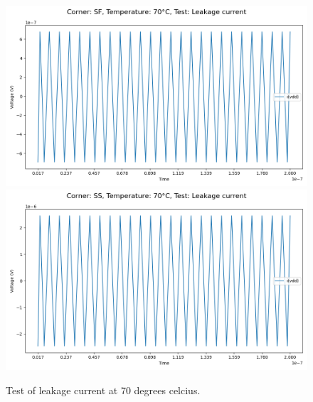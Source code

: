 \begin{figure}[H]
    \vspace{5pt}
    \includegraphics[height= 0.21\textheight]{figures/aimspice/SF/70/I.csv.png}
    \vspace{5pt}
    \includegraphics[height= 0.21\textheight]{figures/aimspice/SS/70/I.csv.png}
    \caption{Test of leakage current at 70 degrees celcius.}
    \label{fig:aimspice_I_70}
\end{figure}


